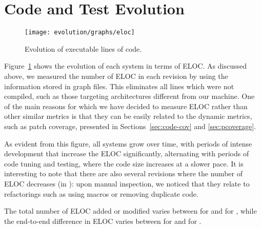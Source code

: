 \section{Code and Test Evolution}
\label{sec:code-test-evol}

\begin{figure}[t]
%
\texttt{[image: evolution/graphs/eloc]}
\caption{Evolution of executable lines of code.}
\label{fig:codebase-evol}
\end{figure}


Figure~\ref{fig:codebase-evol} shows the evolution of each system in
terms of ELOC.  As discussed above, we measured the number of ELOC in
each revision by using the information stored in \gcov graph files.
This eliminates all lines which were not compiled, such as those
targeting architectures different from our machine.  One of the main
reasons for which we have decided to measure ELOC rather than other
similar metrics is that they can be easily related to the dynamic
metrics, such as patch coverage, presented in
Sections~\ref{sec:code-cov} and \ref{sec:pcoverage}.


As evident from this figure, all \numSystems systems grow over time,
with periods of intense development that increase the ELOC
significantly, alternating with periods of code tuning and testing,
where the code size increases at a slower pace.  It is interesting to
note that there are also several revisions where the number of ELOC
decreases (\eg in \zeromq): upon manual inspection, we noticed that
they relate to refactorings such as using macros or removing duplicate
code.


The total number of ELOC added or modified varies
between \redisPatchTotal for \redis and \lighttpdtwoPatchTotal
for \lighttpdtwo, while the end-to-end difference in ELOC varies
between \beanstalkdDeltaSize for \beanstalkd and \lighttpdtwoDeltaSize
for \lighttpdtwo.

